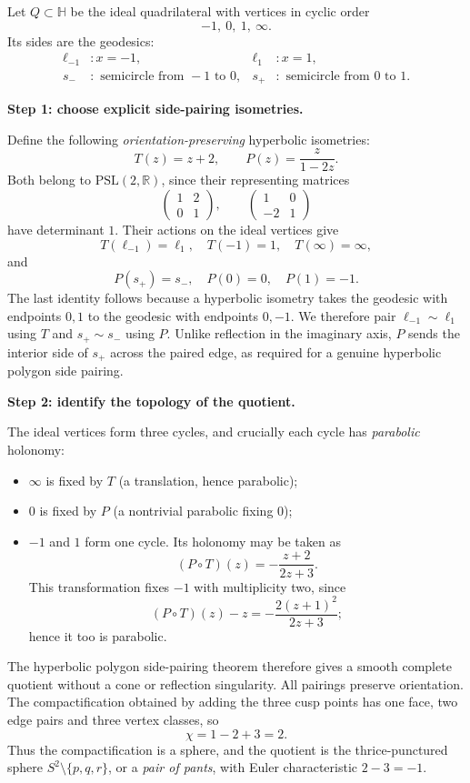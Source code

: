 \begin{solution}
	Let $Q\subset\mathbb{H}$ be the ideal quadrilateral with vertices in cyclic order
	\[
	-1,\ 0,\ 1,\ \infty.
	\]
	Its sides are the geodesics:
	\[
\begin{aligned}
\ell_{-1}&:x=-1, &
\ell_1&:x=1,\\
s_-&:\text{ semicircle from }-1\text{ to }0, &
s_+&:\text{ semicircle from }0\text{ to }1.
\end{aligned}
\]
	
	\par\medskip\noindent\textbf{Step 1: choose explicit side-pairing isometries.}\par\smallskip

	Define the following \emph{orientation-preserving} hyperbolic isometries:
	\[
	T(z)=z+2,\qquad P(z)=\frac{z}{1-2z}.
	\]
	Both belong to $\mathrm{PSL}(2,\mathbb R)$, since their representing
	matrices
	\[
	\begin{pmatrix}1&2\\0&1\end{pmatrix},\qquad
	\begin{pmatrix}1&0\\-2&1\end{pmatrix}
	\]
	have determinant $1$.  Their actions on the ideal vertices give
	\[
	T(\ell_{-1})=\ell_1,\quad T(-1)=1,\quad T(\infty)=\infty,
	\]
	and
	\[
	P(s_+)=s_-,\quad P(0)=0,\quad P(1)=-1.
	\]
	The last identity follows because a hyperbolic isometry takes the
	geodesic with endpoints $0,1$ to the geodesic with endpoints $0,-1$.
	We therefore pair $\ell_{-1}\sim\ell_1$ using $T$ and
	$s_+\sim s_-$ using $P$.  Unlike reflection in the imaginary axis,
	$P$ sends the interior side of $s_+$ across the paired edge, as
	required for a genuine hyperbolic polygon side pairing.
	
	\par\medskip\noindent\textbf{Step 2: identify the topology of the quotient.}\par\smallskip

	The ideal vertices form three cycles, and crucially each cycle
	has \emph{parabolic} holonomy:
	\begin{itemize}
	\item $\infty$ is fixed by $T$ (a translation, hence parabolic);
	\item $0$ is fixed by $P$ (a nontrivial parabolic fixing $0$);
	\item $-1$ and $1$ form one cycle.  Its holonomy may be taken as
	\[
	(P\circ T)(z)=-\frac{z+2}{2z+3}.
	\]
	This transformation fixes $-1$ with multiplicity two, since
	\[
	(P\circ T)(z)-z=-\frac{2(z+1)^2}{2z+3};
	\]
	hence it too is parabolic.
	\end{itemize}
	The hyperbolic polygon side-pairing theorem therefore gives a
	smooth complete quotient without a cone or reflection singularity.
	All pairings preserve orientation.  The compactification obtained by
	adding the three cusp points has one face, two edge pairs and three
	vertex classes, so
	\[
	\chi=1-2+3=2.
	\]
	Thus the compactification is a sphere, and the quotient is the
	thrice-punctured sphere $S^2\setminus\{p,q,r\}$, or a
	\emph{pair of pants}, with Euler characteristic $2-3=-1$.
	

\end{solution}
